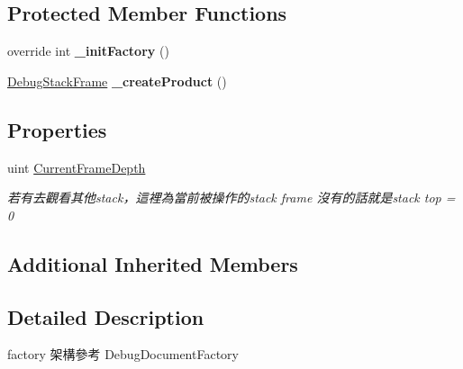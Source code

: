 \subsection*{Protected Member Functions}
\begin{DoxyCompactItemize}
\item 
\hypertarget{classlib_wather_debugger_1_1_stack_1_1_debug_stack_frame_factory_abd77817345461963ddc2c904217f97b6}{override int {\bfseries \+\_\+init\+Factory} ()}\label{classlib_wather_debugger_1_1_stack_1_1_debug_stack_frame_factory_abd77817345461963ddc2c904217f97b6}

\item 
\hypertarget{classlib_wather_debugger_1_1_stack_1_1_debug_stack_frame_factory_a73cd45d0fa42ac61456936e9c5e484e5}{\hyperlink{classlib_wather_debugger_1_1_stack_1_1_debug_stack_frame}{Debug\+Stack\+Frame} {\bfseries \+\_\+create\+Product} ()}\label{classlib_wather_debugger_1_1_stack_1_1_debug_stack_frame_factory_a73cd45d0fa42ac61456936e9c5e484e5}

\end{DoxyCompactItemize}
\subsection*{Properties}
\begin{DoxyCompactItemize}
\item 
uint \hyperlink{classlib_wather_debugger_1_1_stack_1_1_debug_stack_frame_factory_a30a82a02252252bfcba80570c87acd36}{Current\+Frame\+Depth}
\begin{DoxyCompactList}\small\item\em 若有去觀看其他stack，這裡為當前被操作的stack frame 沒有的話就是stack top = 0 \end{DoxyCompactList}\end{DoxyCompactItemize}
\subsection*{Additional Inherited Members}


\subsection{Detailed Description}
factory 架構參考 Debug\+Document\+Factory 



